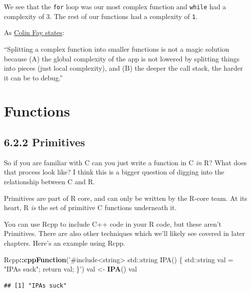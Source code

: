 \documentclass[]{book}
\newenvironment{Shaded}{\begin{snugshade}}{\end{snugshade}}
\newcommand{\KeywordTok}[1]{\textcolor[rgb]{0.13,0.29,0.53}{\textbf{#1}}}
\newcommand{\NormalTok}[1]{#1}
\newcommand{\OperatorTok}[1]{\textcolor[rgb]{0.81,0.36,0.00}{\textbf{#1}}}
\newcommand{\StringTok}[1]{\textcolor[rgb]{0.31,0.60,0.02}{#1}}
\begin{document}
We see that the \texttt{for} loop was our most complex function and \texttt{while} had a complexity of 3. The rest of our functions had a complexity of \texttt{1}.

As \href{https://engineering-shiny.org/successfulshinyapp.html}{Colin Fay states}:

``Splitting a complex function into smaller functions is not a magic solution because (A) the global complexity of the app is not lowered by splitting things into pieces (just local complexity), and (B) the deeper the call stack, the harder it can be to debug.''

\hypertarget{functions}{%
\chapter{Functions}\label{functions}}

\hypertarget{primitives}{%
\section*{6.2.2 Primitives}\label{primitives}}

So if you are familiar with C can you just write a function in C \emph{in} R? What does that process look like? I think this is a bigger question of digging into the relationship between C and R.

Primitives are part of R core, and can only be written by the R-core team. At its heart, R \emph{is} the set of primitive C functions underneath it.

You can use Rcpp to include C++ code in your R code, but these aren't Primitives. There are also other techniques which we'll likely see covered in later chapters. Here's an example using Rcpp.

\begin{Shaded}
\begin{Highlighting}[]
\NormalTok{Rcpp}\OperatorTok{::}\KeywordTok{cppFunction}\NormalTok{(}\StringTok{'#include<string>}
\StringTok{  std::string IPA() \{}
\StringTok{  std::string val = "IPAs suck";    }
\StringTok{  return val;}
\StringTok{  \}'}\NormalTok{)}
\NormalTok{val <-}\StringTok{ }\KeywordTok{IPA}\NormalTok{()}
\NormalTok{val}
\end{Highlighting}
\end{Shaded}

\begin{verbatim}
## [1] "IPAs suck"
\end{verbatim}
\end{document}
